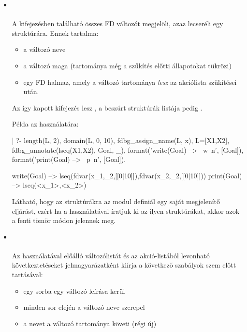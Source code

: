 \begin{itemize}
\item {} \\
   \\
  A  kifejezésben található összes FD változót megjelöli,
  azaz lecseréli egy  struktúrára.  Ennek tartalma:
  \begin{itemize}
  \item a változó neve
  \item a változó maga (tartománya még a szűkítés előtti állapotokat
    tükrözi)
  \item egy FD halmaz, amely a változó tartománya \emph{lesz} az
     akciólista szűkítései után.
  \end{itemize}
  Az így kapott kifejezés lesz , a beszúrt 
  struktúrák listája pedig .

Példa az  használatára:

\begin{prologcode}
| ?- length(L, 2), domain(L, 0, 10), fdbg_assign_name(L, x), 
     L=[X1,X2], fdbg_annotate(lseq(X1,X2), Goal, _), 
     format('write(Goal) --> ~w~n', [Goal]),
     format('print(Goal) --> ~p~n', [Goal]).

write(Goal) --> lseq(fdvar(x_1,_2,[[0|10]]),fdvar(x_2,_2,[[0|10]]))
print(Goal) --> lseq(<x_1>,<x_2>)
\end{prologcode}

Látható, hogy az  struktúrákra az \fdbg modul definiál egy saját
 megjelenítő eljárást, ezért ha a  használatával
íratjuk ki az ilyen struktúrákat, akkor azok a fenti tömör módon jelennek meg.

\item {} \\
    \\
  Az  használatával előálló  változólistát
  és az  akció-listából levonható következtetéseket jelmagyarázatként
  kiírja a következő szabályok szem előtt tartásával:
  \begin{itemize}
  \item egy sorba egy változó leírása kerül
  \item minden sor elején a változó neve szerepel
  \item a nevet a változó tartománya követi (régi \cd{->} új)
  \end{itemize}

\end{itemize}

